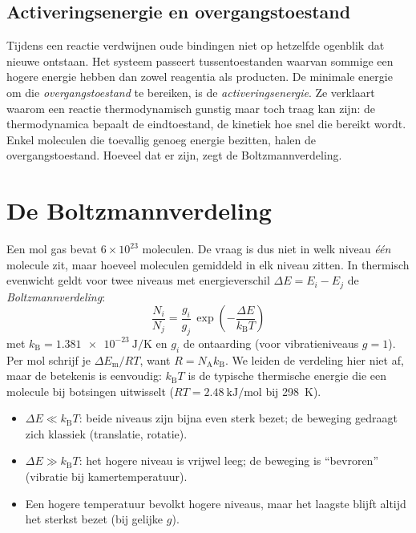 \subsection{Activeringsenergie en overgangstoestand}
\label{sec:activeringsenergie-kwantum}

Tijdens een reactie verdwijnen oude bindingen niet op hetzelfde ogenblik dat nieuwe ontstaan. Het systeem passeert tussentoestanden waarvan sommige een hogere energie hebben dan zowel reagentia als producten. De minimale energie om die \emph{overgangstoestand} te bereiken, is de \emph{activeringsenergie}. Ze verklaart waarom een reactie thermodynamisch gunstig maar toch traag kan zijn: de thermodynamica bepaalt de eindtoestand, de kinetiek hoe snel die bereikt wordt. Enkel moleculen die toevallig genoeg energie bezitten, halen de overgangstoestand. Hoeveel dat er zijn, zegt de Boltzmannverdeling.

\section{De Boltzmannverdeling}
\label{sec:boltzmannverdeling}

Een mol gas bevat $6\times10^{23}$ moleculen. De vraag is dus niet in welk niveau \emph{één} molecule zit, maar hoeveel moleculen gemiddeld in elk niveau zitten. In thermisch evenwicht geldt voor twee niveaus met energieverschil $\Delta E = E_i - E_j$ de \emph{Boltzmannverdeling}:
\begin{equation}
\boxed{\frac{N_i}{N_j} = \frac{g_i}{g_j}\,\exp\!\left(-\frac{\Delta E}{k_\mathrm{B}T}\right)}
\label{eq:boltzmann}
\end{equation}
met $k_\mathrm{B} = \SI{1.381e-23}{\joule\per\kelvin}$ en $g_i$ de ontaarding (voor vibratieniveaus $g = 1$). Per mol schrijf je $\Delta E_\mathrm{m}/RT$, want $R = N_\mathrm{A}k_\mathrm{B}$. We leiden de verdeling hier niet af, maar de betekenis is eenvoudig: $k_\mathrm{B}T$ is de typische thermische energie die een molecule bij botsingen uitwisselt ($RT = \SI{2.48}{\kilo\joule\per\mole}$ bij \SI{298}{\kelvin}).
\begin{itemize}
\item $\Delta E \ll k_\mathrm{B}T$: beide niveaus zijn bijna even sterk bezet; de beweging gedraagt zich klassiek (translatie, rotatie).
\item $\Delta E \gg k_\mathrm{B}T$: het hogere niveau is vrijwel leeg; de beweging is ``bevroren'' (vibratie bij kamertemperatuur).
\item Een hogere temperatuur bevolkt hogere niveaus, maar het laagste blijft altijd het sterkst bezet (bij gelijke $g$).
\end{itemize}

